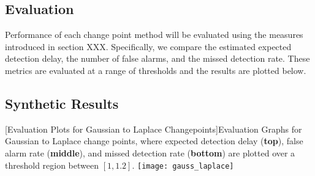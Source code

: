 \subsection{Evaluation}
\label{eval}
Performance of each change point method will be evaluated using the measures introduced in section XXX. Specifically, we compare the estimated expected detection delay, the number of false alarms, and the missed detection rate. These metrics are evaluated at a range of thresholds and the results are plotted below. 

\subsection{Synthetic Results}

\begin{center} 
[Evaluation Plots for Gaussian to Laplace Changepoints]{Evaluation Graphs for Gaussian to Laplace change points, where expected detection delay (\textbf{top}), false alarm rate (\textbf{middle}), and missed detection rate (\textbf{bottom}) are plotted over a threshold region between $[1,1.2]$. } 
\texttt{[image: gauss\_laplace]} 
\label{fig:gauss_laplace_results} 
\end{center}